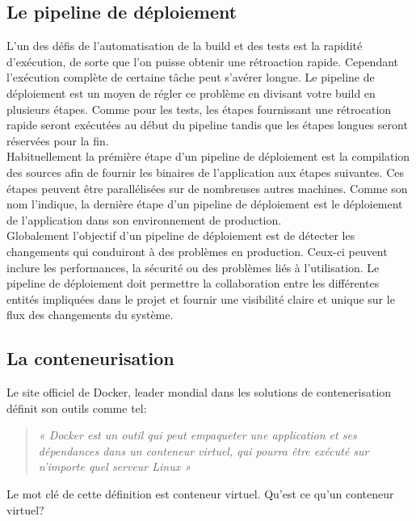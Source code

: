     \subsection{Le pipeline de déploiement}\label{DeployementPipeline}
    L'un des défis de l'automatisation de la build et des tests est la rapidité d'exécution, de sorte que l'on puisse obtenir une rétroaction rapide. Cependant l'exécution complète de certaine tâche peut s'avérer longue. Le pipeline de déploiement \cite{Fow13} est un moyen de régler ce problème en divisant votre build en plusieurs étapes. Comme pour les tests, les étapes fournissant une rétrocation rapide seront exécutées au début du pipeline tandis que les étapes longues seront réservées pour la fin.\\

    Habituellement la prémière étape d'un pipeline de déploiement est la compilation des sources afin de fournir les binaires de l'application aux étapes suivantes. Ces étapes peuvent être parallélisées sur de nombreuses autres machines. Comme son nom l'indique, la dernière étape d'un pipeline de déploiement est le déploiement de l'application dans son environnement de production.\\

    Globalement l'objectif d'un pipeline de déploiement est de détecter les changements qui conduiront à des problèmes en production. Ceux-ci peuvent inclure les performances, la sécurité ou des problèmes liés à l'utilisation. Le pipeline de déploiement doit permettre la collaboration entre les différentes entités impliquées dans le projet et fournir une visibilité claire et unique sur le flux des changements du système.

    \subsection{La conteneurisation}\label{Containers}
    Le site officiel de Docker, leader mondial dans les solutions de contenerisation définit son outils comme tel:\\

    \begin{quotation}
      \emph{« Docker est un outil qui peut empaqueter une application et ses dépendances dans un conteneur virtuel, qui pourra être exécuté sur n’importe quel serveur Linux »}\\
    \end{quotation}

    Le mot clé de cette définition est conteneur virtuel. Qu’est ce qu’un conteneur virtuel?

